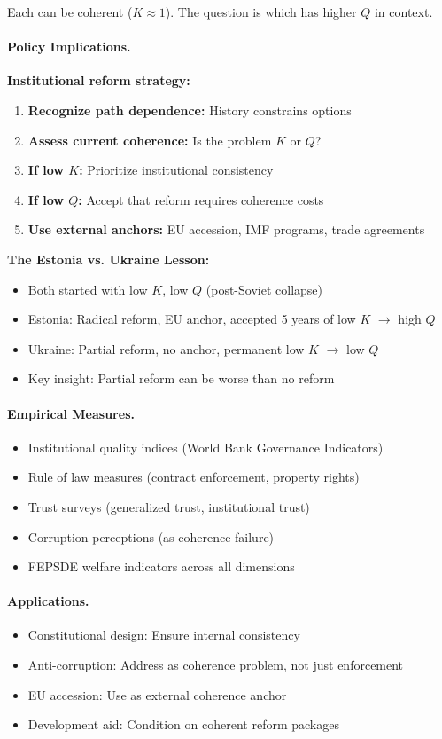 \documentclass[12pt,a4paper]{article}
\begin{document}
Each can be coherent ($K \approx 1$). The question is which has higher $Q$ in context.

\paragraph{Policy Implications.}
\textbf{Institutional reform strategy:}
\begin{enumerate}
  \item \textbf{Recognize path dependence:} History constrains options
  \item \textbf{Assess current coherence:} Is the problem $K$ or $Q$?
  \item \textbf{If low $K$:} Prioritize institutional consistency
  \item \textbf{If low $Q$:} Accept that reform requires coherence costs
  \item \textbf{Use external anchors:} EU accession, IMF programs, trade agreements
\end{enumerate}

\textbf{The Estonia vs. Ukraine Lesson:}
\begin{itemize}
  \item Both started with low $K$, low $Q$ (post-Soviet collapse)
  \item Estonia: Radical reform, EU anchor, accepted 5 years of low $K$ $\rightarrow$ high $Q$
  \item Ukraine: Partial reform, no anchor, permanent low $K$ $\rightarrow$ low $Q$
  \item Key insight: Partial reform can be worse than no reform
\end{itemize}

\paragraph{Empirical Measures.}
\begin{itemize}
  \item Institutional quality indices (World Bank Governance Indicators)
  \item Rule of law measures (contract enforcement, property rights)
  \item Trust surveys (generalized trust, institutional trust)
  \item Corruption perceptions (as coherence failure)
  \item FEPSDE welfare indicators across all dimensions
\end{itemize}

\paragraph{Applications.}
\begin{itemize}
  \item Constitutional design: Ensure internal consistency
  \item Anti-corruption: Address as coherence problem, not just enforcement
  \item EU accession: Use as external coherence anchor
  \item Development aid: Condition on coherent reform packages
\end{itemize}
\end{document}
